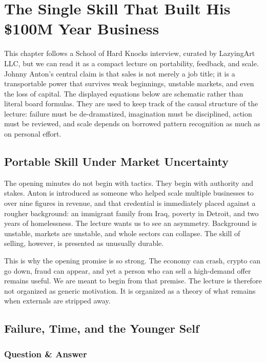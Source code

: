 \chapter{The Single Skill That Built His \$100M Year Business}

This chapter follows a School of Hard Knocks interview, curated by LazyingArt LLC, but we can read it as a compact lecture on portability, feedback, and scale. Johnny Anton's central claim is that sales is not merely a job title; it is a transportable power that survives weak beginnings, unstable markets, and even the loss of capital. The displayed equations below are schematic rather than literal board formulas. They are used to keep track of the causal structure of the lecture: failure must be de-dramatized, imagination must be disciplined, action must be reviewed, and scale depends on borrowed pattern recognition as much as on personal effort.

\section{Portable Skill Under Market Uncertainty}

The opening minutes do not begin with tactics. They begin with authority and stakes. Anton is introduced as someone who helped scale multiple businesses to over nine figures in revenue, and that credential is immediately placed against a rougher background: an immigrant family from Iraq, poverty in Detroit, and two years of homelessness. The lecture wants us to see an asymmetry. Background is unstable, markets are unstable, and whole sectors can collapse. The skill of selling, however, is presented as unusually durable.

This is why the opening promise is so strong. The economy can crash, crypto can go down, fraud can appear, and yet a person who can sell a high-demand offer remains useful. We are meant to begin from that premise. The lecture is therefore not organized as generic motivation. It is organized as a theory of what remains when externals are stripped away.

\section{Failure, Time, and the Younger Self}

\subsection{Question \& Answer}

